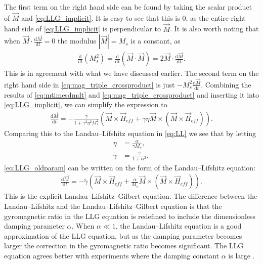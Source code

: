 \documentclass[12pt, a4paper]{article}		%
\numberwithin{equation}{section}
\begin{document}
The first term on the right hand side can be found by taking the scalar product of $\vec{M}$ and \eqref{eq:LLG_implicit}. It is easy to see that this is 0, as the entire right hand side of \eqref{eq:LLG_implicit} is perpendicular to $\vec{M}$. It is also worth noting that when $\vec{M}\cdot \frac{\textrm{d} \vec{M}}{\textrm{d} t} = 0$ the modulus $|\vec{M}| = M_s$ is a constant, as 
\begin{align}
\frac{\textrm{d}}{\textrm{d} t} (M_s^2) = \frac{\textrm{d}}{\textrm{d} t} (\vec{M}\cdot\vec{M}) = 2 \vec{M} \cdot \frac{\textrm{d} \vec{M}}{\textrm{d} t}.
\end{align}
This is in agreement with what we have discussed earlier. The second term on the right hand side in \eqref{eq:mag_triple_crossproduct} is just $-M_s^2 \frac{\textrm{d} \vec{M}}{\textrm{d} t}$. Combining the results of \eqref{eq:mtimesdmdt} and \eqref{eq:mag_triple_crossproduct} and inserting it into \eqref{eq:LLG_implicit}, we can simplify the expression to
\begin{align}
\label{eq:LLG_oldparam}
\frac{\textrm{d} \vec{M}}{\textrm{d} t} = -\frac{\gamma}{1 + \gamma^2\eta^2 M_s^2}(\vec{M}\times\vec{H}_{eff} + \gamma\eta \vec{M} \times (\vec{M}\times\vec{H}_{eff})).
\end{align}
Comparing this to the Landau--Lifshitz equation in \eqref{eq:LL} we see that by letting
\begin{align}
\eta &= \frac{\alpha}{\gamma M_s}, \\
\tilde{\gamma} &= \frac{\gamma}{1+\alpha^2},
\end{align}
\eqref{eq:LLG_oldparam} can be written on the form of the Landau--Lifshitz equation:
\begin{align}
\label{eq:LLG}
\frac{\textrm{d} \vec{M}}{\textrm{d} t} = -\tilde{\gamma} (\vec{M} \times \vec{H}_{eff} + \frac{\alpha}{M_s} \vec{M}\times(\vec{M}\times\vec{H}_{eff})).
\end{align}
This is the explicit Landau--Lifshitz--Gilbert equation. The difference between the Landau--Lifshitz and the Landau--Lifshitz--Gilbert equation is that the gyromagnetic ratio in the LLG equation is redefined to include the dimensionless damping parameter $\alpha$. When $\alpha \ll 1$, the Landau--Lifshitz equation is a good approximation of the LLG equation, but as the damping parameter becomes larger the correction in the gyromagnetic ratio becomes significant. The LLG equation agrees better with experiments where the damping constant $\alpha$ is large \cite{GilbertKelly1955}.
\end{document}
